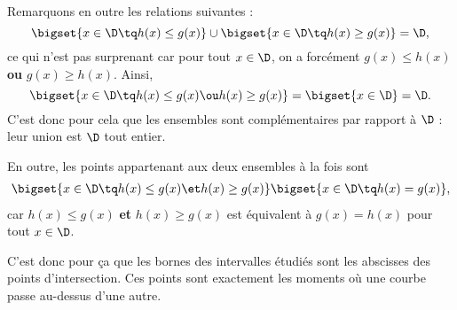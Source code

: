 {	Remarquons en outre les relations suivantes :
		\[ \bigset{ x \in \D \tq h(x) \leq g(x) } \cup \bigset{ x \in \D \tq h(x) \geq g(x) } = \D, \]
	ce qui n'est pas  surprenant car pour tout $x\in\D$, on a forcément $g(x) \leq h(x)$ \textbf{ou} $g(x) \geq h(x)$. 
	Ainsi, 
		\[ \bigset{ x \in \D \tq h(x) \leq g(x) \ou  h(x) \geq g(x) }  = \bigset{ x \in \D } = \D. \]
	C'est donc pour cela que les ensembles sont complémentaires par rapport à $\D$ : leur union est $\D$ tout entier.
	
	En outre, les points appartenant aux deux ensembles à la fois sont
		\begin{align*}
		 \bigset{ x \in \D \tq h(x) \leq g(x) \et h(x) \geq g(x) } \bigset{ x \in \D \tq h(x) = g(x) },
		 \end{align*}
	car $h(x) \leq g(x)$ \textbf{et} $h(x) \geq g(x)$ est équivalent à $g(x) = h(x)$ pour tout $x\in\D$.
	
	C'est donc pour ça que les bornes des intervalles étudiés sont les abscisses des points d'intersection.
	Ces points sont exactement les moments où une courbe passe au-dessus d'une autre.
}


